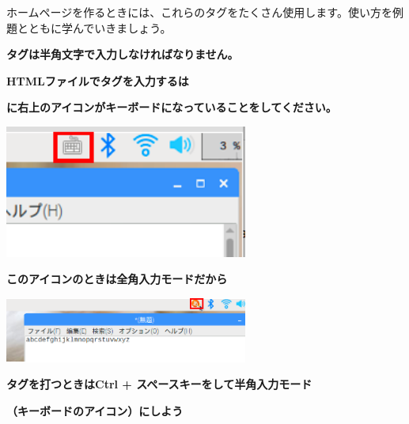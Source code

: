 \documentclass[a4paper,12pt]{jarticle}
\begin{document}
\bigskip
ホームページを作るときには、これらのタグをたくさん使用します。使い方を例題とともに学んでいきましょう。


\clearpage


{\centering\bfseries
  タグは半角文字で入力しなければなりません。
  \par}

{\centering\bfseries
  HTMLファイルでタグを入力するは
  \par}

{\centering\bfseries
  に右上のアイコンがキーボードになっていることをしてください。
  \par}

\centering
\includegraphics[width=0.6\textwidth]{textbook-img159.png}





\bigskip

\bigskip

\bigskip

\bigskip


{\centering\bfseries
  このアイコンのときは全角入力モードだから
  \par}

\centering
\includegraphics[width=0.6\textwidth]{textbook-img160.png}


\bigskip


\bigskip

{\centering\bfseries
  タグを打つときはCtrl +
  スペースキーをして半角入力モード
  \par}

{\centering\bfseries
  （キーボードのアイコン）にしよう
  \par}

\clearpage
\flushleft
{}
\end{document}

